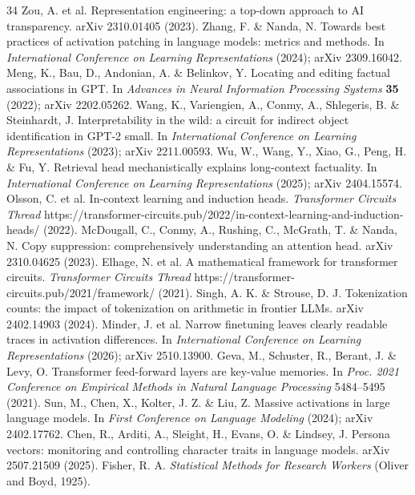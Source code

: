 \begin{thebibliography}{34}
 Zou, A. et al. Representation engineering: a top-down approach to AI transparency. arXiv 2310.01405 (2023).
 Zhang, F. \& Nanda, N. Towards best practices of activation patching in language models: metrics and methods. In \textit{International Conference on Learning Representations} (2024); arXiv 2309.16042.
 Meng, K., Bau, D., Andonian, A. \& Belinkov, Y. Locating and editing factual associations in GPT. In \textit{Advances in Neural Information Processing Systems} \textbf{35} (2022); arXiv 2202.05262.
 Wang, K., Variengien, A., Conmy, A., Shlegeris, B. \& Steinhardt, J. Interpretability in the wild: a circuit for indirect object identification in GPT-2 small. In \textit{International Conference on Learning Representations} (2023); arXiv 2211.00593.
 Wu, W., Wang, Y., Xiao, G., Peng, H. \& Fu, Y. Retrieval head mechanistically explains long-context factuality. In \textit{International Conference on Learning Representations} (2025); arXiv 2404.15574.
 Olsson, C. et al. In-context learning and induction heads. \textit{Transformer Circuits Thread} https://transformer-circuits.pub/2022/in-context-learning-and-induction-heads/ (2022).
 McDougall, C., Conmy, A., Rushing, C., McGrath, T. \& Nanda, N. Copy suppression: comprehensively understanding an attention head. arXiv 2310.04625 (2023).
 Elhage, N. et al. A mathematical framework for transformer circuits. \textit{Transformer Circuits Thread} https://transformer-circuits.pub/2021/framework/ (2021).
 Singh, A. K. \& Strouse, D. J. Tokenization counts: the impact of tokenization on arithmetic in frontier LLMs. arXiv 2402.14903 (2024).
 Minder, J. et al. Narrow finetuning leaves clearly readable traces in activation differences. In \textit{International Conference on Learning Representations} (2026); arXiv 2510.13900.
 Geva, M., Schuster, R., Berant, J. \& Levy, O. Transformer feed-forward layers are key-value memories. In \textit{Proc. 2021 Conference on Empirical Methods in Natural Language Processing} 5484--5495 (2021).
 Sun, M., Chen, X., Kolter, J. Z. \& Liu, Z. Massive activations in large language models. In \textit{First Conference on Language Modeling} (2024); arXiv 2402.17762.
 Chen, R., Arditi, A., Sleight, H., Evans, O. \& Lindsey, J. Persona vectors: monitoring and controlling character traits in language models. arXiv 2507.21509 (2025).
 Fisher, R. A. \textit{Statistical Methods for Research Workers} (Oliver and Boyd, 1925).

\end{thebibliography}
